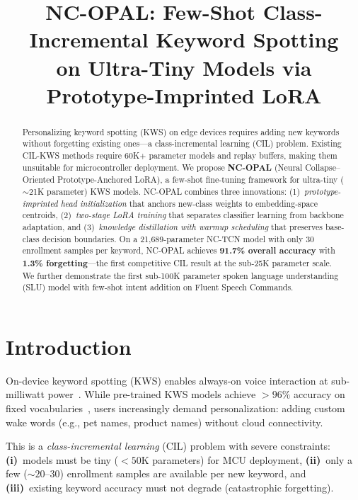 \documentclass{Interspeech}
\title{NC-OPAL: Few-Shot Class-Incremental Keyword Spotting\\on Ultra-Tiny Models via Prototype-Imprinted LoRA}
\begin{document}
\maketitle

\begin{abstract}
Personalizing keyword spotting (KWS) on edge devices requires adding new keywords without forgetting existing ones---a class-incremental learning (CIL) problem.
Existing CIL-KWS methods require 60K+ parameter models and replay buffers, making them unsuitable for microcontroller deployment.
We propose \textbf{NC-OPAL} (Neural Collapse--Oriented Prototype-Anchored LoRA), a few-shot fine-tuning framework for ultra-tiny ($\sim$21K parameter) KWS models.
NC-OPAL combines three innovations:
(1)~\emph{prototype-imprinted head initialization} that anchors new-class weights to embedding-space centroids,
(2)~\emph{two-stage LoRA training} that separates classifier learning from backbone adaptation, and
(3)~\emph{knowledge distillation with warmup scheduling} that preserves base-class decision boundaries.
On a 21,689-parameter NC-TCN model with only 30 enrollment samples per keyword, NC-OPAL achieves \textbf{91.7\% overall accuracy} with \textbf{1.3\% forgetting}---the first competitive CIL result at the sub-25K parameter scale.
We further demonstrate the first sub-100K parameter spoken language understanding (SLU) model with few-shot intent addition on Fluent Speech Commands.
\end{abstract}

\section{Introduction}
\label{sec:intro}

On-device keyword spotting (KWS) enables always-on voice interaction at sub-milliwatt power~\cite{zhang2017hello,kim2021bcresnet}.
While pre-trained KWS models achieve ${>}96\%$ accuracy on fixed vocabularies~\cite{choi2019temporal,berg2021keyword}, users increasingly demand personalization: adding custom wake words (e.g., pet names, product names) without cloud connectivity.

This is a \emph{class-incremental learning} (CIL) problem with severe constraints:
\textbf{(i)}~models must be tiny (${<}50$K parameters) for MCU deployment,
\textbf{(ii)}~only a few (${\sim}20$--$30$) enrollment samples are available per new keyword, and
\textbf{(iii)}~existing keyword accuracy must not degrade (catastrophic forgetting).
\end{document}

